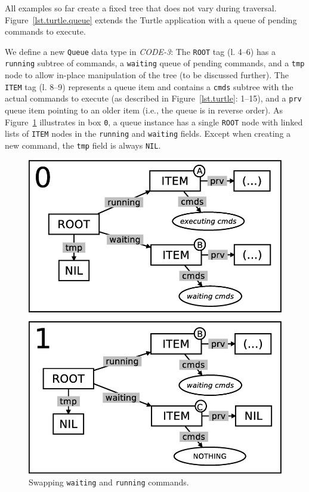 \documentclass{sig-alternate}
\newcommand{\code}[1] {{\small{\texttt{#1}}}}
\begin{document}
All examples so far create a fixed tree that does not vary during traversal.
%
Figure~\ref{lst.turtle.queue} extends the Turtle application with a queue of 
pending commands to execute.

We define a new \code{Queue} data type in \emph{CODE-3}:
The \code{ROOT} tag (l. 4--6) has a \code{running} subtree of commands, a 
\code{waiting} queue of pending commands, and a \code{tmp} node to allow 
in-place manipulation of the tree (to be discussed further).
%
The \code{ITEM} tag (l. 8--9) represents a queue item and contains a 
\code{cmds} subtree with the actual commands to execute (as described in 
Figure~\ref{lst.turtle}: 1--15), and a \code{prv} queue item pointing to an 
older item (i.e., the queue is in reverse order).
%
As Figure~\ref{fig.queue-1} illustrates in box \code{0}, a queue instance has a 
single \code{ROOT} node with linked lists of \code{ITEM} nodes in the 
\code{running} and \code{waiting} fields.
Except when creating a new command, the \code{tmp} field is always \code{NIL}.

\begin{figure}[t]
\centering
\includegraphics[scale=0.24]{queue-fig-1.eps}
\caption{
Swapping \code{waiting} and \code{running} commands.
\label{fig.queue-1}
}
\end{figure}
\end{document}

